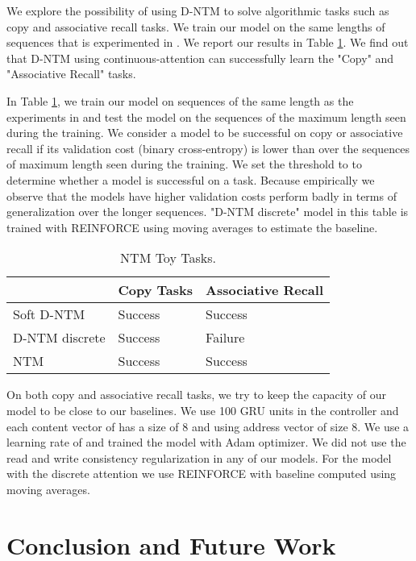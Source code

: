 \documentclass[12pt]{article}
\begin{document}
We explore the possibility of using D-NTM to solve algorithmic tasks such as copy and associative recall tasks. We train our model on the same lengths of sequences that is experimented in \citep{graves2014neural}. We report our results in Table \ref{tbl:ntm_toy_tasks}. We find out that D-NTM using continuous-attention can successfully learn the "Copy" and "Associative Recall" tasks.

In Table \ref{tbl:ntm_toy_tasks}, we train our model on sequences of the same length as the experiments in \citep{graves2014neural} and test the model on the sequences of the maximum length seen during the training. We consider a model to be successful on copy or associative recall if its validation cost (binary cross-entropy) is lower than  over the sequences of maximum length seen during the training. We set the threshold to  to determine whether a model is successful on a task. Because empirically we observe that the models have higher validation costs perform badly in terms of generalization over the longer sequences. "D-NTM discrete" model in this table is trained with REINFORCE using moving averages to estimate the baseline.

\begin{table}[ht!]

\centering
\footnotesize
\begin{tabular}{@{}lll@{}}
\toprule
           & Copy Tasks & Associative Recall \\ \midrule
Soft D-NTM & Success    & Success            \\
D-NTM discrete & Success    & Failure            \\
NTM        & Success     & Success            \\ \bottomrule
\end{tabular}
\caption{NTM Toy Tasks.}
\label{tbl:ntm_toy_tasks}
\end{table}

On both copy and associative recall tasks, we try to keep the capacity of our model to be close to our baselines. We use 100 GRU units in the controller and each content vector of has a size of 8 and using  address vector of size 8. We use a learning rate of  and trained the model with Adam optimizer. We did not use the read and write consistency regularization in any of our models. For the model with the discrete attention we use REINFORCE with baseline computed using moving averages.

\section{Conclusion and Future Work}
\end{document}
